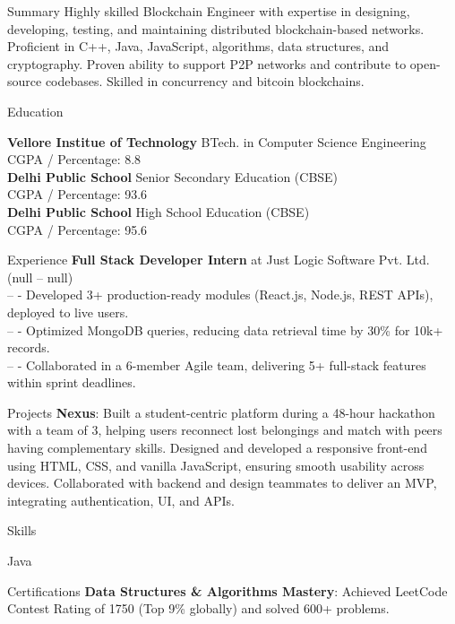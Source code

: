 \documentclass{resume}
\begin{document}
    \begin{rSection}{Summary}
    Highly skilled Blockchain Engineer with expertise in designing, developing, testing, and maintaining distributed blockchain-based networks. Proficient in C++, Java, JavaScript, algorithms, data structures, and cryptography. Proven ability to support P2P networks and contribute to open-source codebases. Skilled in concurrency and bitcoin blockchains.
    \end{rSection}

    \begin{rSection}{Education}
    
    \textbf{ Vellore Institue of Technology } \hfill BTech. in Computer Science Engineering\\
    CGPA / Percentage: 8.8\\[6pt]
    
    \textbf{ Delhi Public School } \hfill Senior Secondary Education (CBSE)\\
    CGPA / Percentage: 93.6\\[6pt]
    
    \textbf{ Delhi Public School } \hfill High School Education (CBSE)\\
    CGPA / Percentage: 95.6\\[6pt]
    
    \end{rSection}

    \begin{rSection}{Experience}
    \textbf{Full Stack Developer Intern} at Just Logic Software Pvt. Ltd. \hfill (null -- null)\\
-- - Developed 3+ production-ready modules (React.js, Node.js, REST APIs), deployed to live users.\\
-- - Optimized MongoDB queries, reducing data retrieval time by 30\% for 10k+ records.\\
-- - Collaborated in a 6-member Agile team, delivering 5+ full-stack features within sprint deadlines.

    \end{rSection}

    \begin{rSection}{Projects}
    \textbf{Nexus}: Built a student-centric platform during a 48-hour hackathon with a team of 3, helping users reconnect lost belongings and match with peers having complementary skills. Designed and developed a responsive front-end using HTML, CSS, and vanilla JavaScript, ensuring smooth usability across devices. Collaborated with backend and design teammates to deliver an MVP, integrating authentication, UI, and APIs.
    \end{rSection}

    \begin{rSection}{Skills}
    
    Java\\
    
    \end{rSection}

    \begin{rSection}{Certifications}
    \textbf{Data Structures \& Algorithms Mastery}: Achieved LeetCode Contest Rating of 1750 (Top 9\% globally) and solved 600+ problems.\\
    \end{rSection}

    
\end{document}
